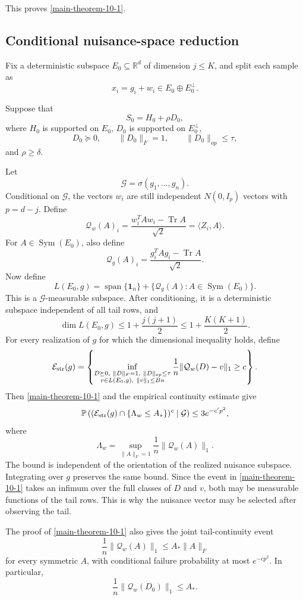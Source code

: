 \documentclass[11pt]{article}
\numberwithin{equation}{section}
\theoremstyle{definition}
\theoremstyle{remark}
\newcommand{\Pp}{\mathbb P}
\newcommand{\1}{\boldsymbol 1}
\begin{document}
\begin{aiblock}
This proves \cref{main-theorem-10-1}.

\subsection{Conditional nuisance-space reduction}\label{conditional-nuisance-spaces-in-the-peeling-argument}

Fix a deterministic subspace $E_0\subseteq\mathbb R^d$ of
dimension $j\le K$, and split each sample as
\[
  x_i=g_i+w_i\in E_0\oplus E_0^\perp.
\]

Suppose that
\[
S_0=H_0+\rho D_0,
\]
where $H_0$ is supported on $E_0$, $D_0$ is supported on
$E_0^\perp$,
\[
D_0\succeq0,\qquad
\|D_0\|_F=1,\qquad
\|D_0\|_{op}\le\tau,
\]
and $\rho\ge\delta$.


Let
\[
  \mathcal G=\sigma(g_1,\ldots,g_n).
\]
Conditional on $\mathcal G$, the vectors $w_i$ are still
independent $N(0,I_p)$ vectors with $p=d-j$. Define
\[
  \mathcal Q_w(A)_i=\frac{w_i^TAw_i-\operatorname{Tr}A}
  {\sqrt2} =\langle Z_i,A\rangle.
\]
For $A\in\operatorname{Sym}(E_0)$, also define
\[
  \mathcal Q_g(A)_i=\frac{g_i^TAg_i-\operatorname{Tr}A}
  {\sqrt2}.
\]
Now define
\[
  L(E_0,g)=\operatorname{span}\{\1_n\}+\{\mathcal Q_g(A):
  A\in\operatorname{Sym}(E_0)\}.
\]
This is a $\mathcal G$-measurable subspace. After
conditioning, it is a deterministic subspace independent
of all tail rows, and
\[
  \dim L(E_0,g)\le1+\frac{j(j+1)}2\le1+\frac{K(K+1)}2.
\]
For every realization of $g$ for which the dimensional
inequality holds, define
\[
  \mathcal E_{\rm str}(g)=\left\{ \inf_{\substack{D\succeq0,\
  \|D\|_F=1,\ \|D\|_{op}\le\tau\\ v\in L(E_0,g),\
  \|v\|_1\le Bn}} \frac1n\|\mathcal Q_w(D)-v\|_1\ge c
  \right\}.
\]
Then \cref{main-theorem-10-1} and the empirical
continuity estimate give
\[
  \Pp\left((\mathcal E_{\rm str}(g)\cap\{\Lambda_w\le
  A_*\})^c\mid\mathcal G\right)\le3e^{-c'p^2},
\]
where
\[
  \Lambda_w=\sup_{\|A\|_F=1}\frac1n\|\mathcal Q_w(A)\|_1.
\]
The bound is independent of the orientation of the
realized nuisance subspace. Integrating over $g$
preserves the same bound. Since the event in
\cref{main-theorem-10-1} takes an infimum over the full
classes of $D$ and $v$, both may be measurable functions
of the tail rows. This is why the nuisance vector may be
selected after observing the tail.


The proof of \cref{main-theorem-10-1} also gives the
joint tail-continuity event
\[
  \frac1n\|\mathcal Q_w(A)\|_1\le A_*\|A\|_F
\]
for every symmetric $A$, with conditional failure probability at most
$e^{-cp^2}$. In particular,
\[
  \frac1n\|\mathcal Q_w(D_0)\|_1\le A_*.
\]



\end{aiblock}
\end{document}
